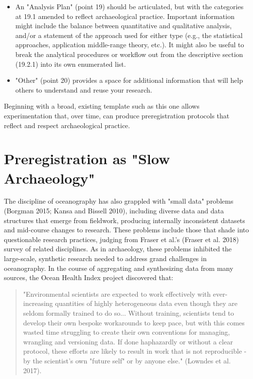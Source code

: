 \documentclass[article]{sa}
\begin{document}
\begin{itemize}
\item  An "Analysis Plan" (point 19) should be articulated, but with the
  categories at 19.1 amended to reflect archaeological practice.
  Important information might include the balance between quantitative
  and qualitative analysis, and/or a statement of the approach used for
  either type (e.g., the statistical approaches, application
  middle-range theory, etc.). It might also be useful to break the
  analytical procedures or workflow out from the descriptive section
  (19.2.1) into its own enumerated list.
  
\item "Other" (point 20) provides a space for additional information that
  will help others to understand and reuse your research.
 
\end{itemize}

Beginning with a broad, existing template such as this one allows
experimentation that, over time, can produce preregistration protocols
that reflect and respect archaeological practice.

\section{Preregistration as "Slow
Archaeology"}

The discipline of oceanography has also grappled with "small data"
problems (Borgman 2015; Kansa and Bissell 2010), including diverse data
and data structures that emerge from fieldwork, producing internally
inconsistent datasets and mid-course changes to research. These problems
include those that shade into questionable research practices, judging
from Fraser et al.'s (Fraser et al. 2018) survey of related disciplines.
As in archaeology, these problems inhibited the large-scale, synthetic
research needed to address grand challenges in oceanography. In the
course of aggregating and synthesizing data from many sources, the Ocean
Health Index project discovered that:

\begin{quote}

"Environmental scientists are expected to work effectively with
ever-increasing quantities of highly heterogeneous data even though they
are seldom formally trained to do so... Without training, scientists
tend to develop their own bespoke workarounds to keep pace, but with
this comes wasted time struggling to create their own conventions for
managing, wrangling and versioning data. If done haphazardly or without
a clear protocol, these efforts are likely to result in work that is not
reproducible - by the scientist's own "future self" or by anyone else."
(Lowndes et al. 2017).

\end{quote}
\end{document}
